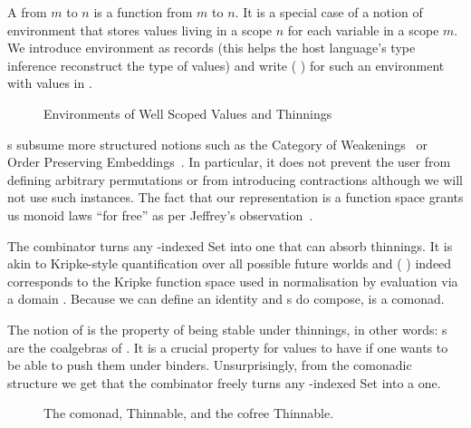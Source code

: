 A  from $m$ to $n$ is a function from  $m$ to
 $n$. It is a special case of a notion of environment that
stores values living in a scope $n$ for each variable in a scope $m$.
We introduce environment as records (this helps the host language's
type inference reconstruct the type of values) and write
( )   for such an environment with values
in .

\begin{figure}[h]
\begin{minipage}{0.55\textwidth}
\end{minipage}\hspace{2em}
\begin{minipage}{0.35\textwidth}
\end{minipage}
\caption{Environments of Well Scoped Values and Thinnings}
\end{figure}

s subsume more structured notions such as the Category of
Weakenings~\cite{altenkirch1995categorical} or Order Preserving
Embeddings~\cite{chapman2009type}. In particular, it does not prevent the
user from defining arbitrary permutations or from introducing contractions
although we will not use such instances. The fact that our representation
is a function space grants us monoid laws ``for free'' as per Jeffrey's
observation~\citeyear{jeffrey2011assoc}.

The  combinator turns any -indexed Set into one that can absorb
thinnings. It is akin to Kripke-style quantification over all possible future
worlds and  (  ) indeed corresponds to the Kripke
function space used in normalisation by evaluation via a domain .
Because we can define an identity  and s do
compose,  is a comonad.

The notion of  is the property of being stable under thinnings,
in other words: s are the coalgebras of .
It is a crucial property for values to have if one wants to be able to push
them under binders. Unsurprisingly, from the comonadic structure we get that
the  combinator freely turns any -indexed Set into a 
one.

\begin{figure}[h]
\begin{minipage}{0.45\textwidth}
\end{minipage}\hspace{2em}
\begin{minipage}{0.45\textwidth}
\end{minipage}
\caption{The  comonad, Thinnable, and the cofree Thinnable.}
\end{figure}

